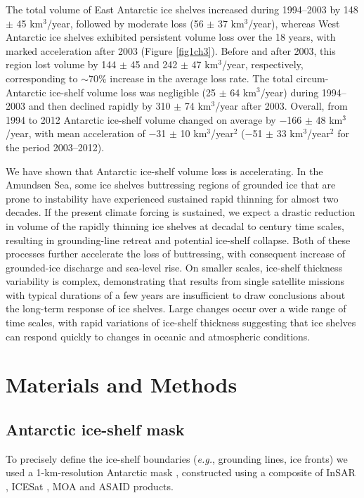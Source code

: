 The total volume of East Antarctic ice shelves
increased during 1994--2003 by 148 $\pm$ 45 km$^3$/year,
followed by moderate loss (56 $\pm$ 37 km$^3$/year),
whereas West Antarctic ice shelves exhibited
persistent volume loss over the 18 years, with
marked acceleration after 2003 (Figure \ref{fig1ch3}). Before
and after 2003, this region lost volume by 144 $\pm$ 45 and 
242 $\pm$ 47 km$^3$/year, respectively, corresponding
to $\sim$70\% increase in the average loss
rate. The total circum-Antarctic ice-shelf volume
loss was negligible (25 $\pm$ 64 km$^3$/year) during
1994--2003 and then declined rapidly by 
310 $\pm$ 74 km$^3$/year after 2003. Overall, from 1994 to
2012 Antarctic ice-shelf volume changed on average
by $-$166 $\pm$ 48 km$^3$/year, with mean acceleration
of $-$31 $\pm$ 10 km$^3$/year$^2$ ($-$51 $\pm$ 33 km$^3$/year$^2$ for the
period 2003--2012).

We have shown that Antarctic ice-shelf volume
loss is accelerating. In the Amundsen Sea,
some ice shelves buttressing regions of grounded
ice that are prone to instability have experienced
sustained rapid thinning for almost two decades.
If the present climate forcing is sustained, we
expect a drastic reduction in volume of the rapidly
thinning ice shelves at decadal to century
time scales, resulting in grounding-line retreat
and potential ice-shelf collapse. Both of these processes
further accelerate the loss of buttressing,
with consequent increase of grounded-ice
discharge and sea-level rise. On smaller scales,
ice-shelf thickness variability is complex, demonstrating
that results from single satellite missions
with typical durations of a few years are
insufficient to draw conclusions about the long-term
response of ice shelves. Large changes occur
over a wide range of time scales, with rapid variations
of ice-shelf thickness suggesting that ice
shelves can respond quickly to changes in oceanic
and atmospheric conditions.

\section*{Materials and Methods}

\subsection*{Antarctic ice-shelf mask}

To precisely define the ice-shelf boundaries ({\it e.g.}, grounding lines, ice
fronts) we used a 1-km-resolution Antarctic mask \parencite{Depoorter2013},
constructed using a composite of InSAR \parencite{Rignot2011}, ICESat 
\parencite{Fricker2006, Brunt2010}, MOA \parencite{Scambos2007} and ASAID
\parencite{Bindschadler2011} products.

